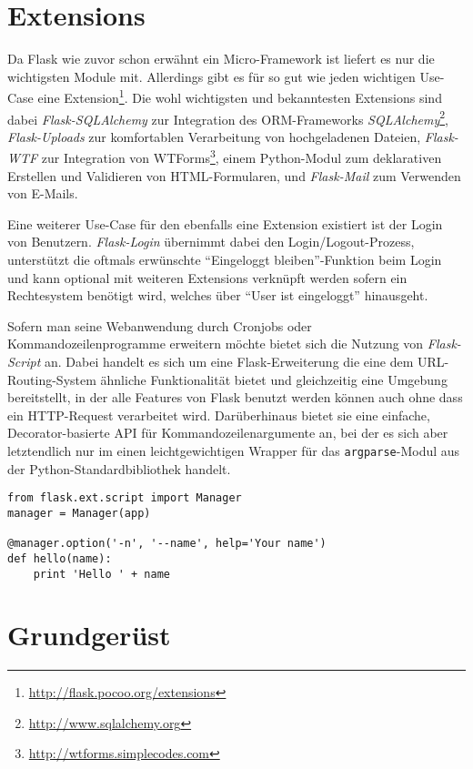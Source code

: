 \section{Extensions}

Da Flask wie zuvor schon erwähnt ein Micro-Framework ist liefert es nur die wichtigsten Module mit.
Allerdings gibt es für so gut wie jeden wichtigen Use-Case eine
Extension\footnote{\href{http://flask.pocoo.org/extensions}{http://flask.pocoo.org/extensions}}. Die
wohl wichtigsten und bekanntesten Extensions sind dabei \emph{Flask-SQLAlchemy} zur Integration des
ORM-Frameworks
\emph{SQLAlchemy}\footnote{\href{http://www.sqlalchemy.org}{http://www.sqlalchemy.org}},
\emph{Flask-Uploads} zur komfortablen Verarbeitung von hochgeladenen Dateien, \emph{Flask-WTF} zur
Integration von
WTForms\footnote{\href{http://wtforms.simplecodes.com}{http://wtforms.simplecodes.com}}, einem
Python-Modul zum deklarativen Erstellen und Validieren von HTML-Formularen, und \emph{Flask-Mail}
zum Verwenden von E-Mails.

Eine weiterer Use-Case für den ebenfalls eine Extension existiert ist der Login von Benutzern.
\emph{Flask-Login} übernimmt dabei den Login/Logout-Prozess, unterstützt die oftmals erwünschte
\enquote{Eingeloggt bleiben}-Funktion beim Login und kann optional mit weiteren Extensions verknüpft
werden sofern ein Rechtesystem benötigt wird, welches über \enquote{User ist eingeloggt} hinausgeht.

Sofern man seine Webanwendung durch Cronjobs oder Kommandozeilenprogramme erweitern möchte bietet
sich die Nutzung von \emph{Flask-Script} an. Dabei handelt es sich um eine Flask-Erweiterung die
eine dem URL-Routing-System ähnliche Funktionalität bietet und gleichzeitig eine Umgebung
bereitstellt, in der alle Features von Flask benutzt werden können auch ohne dass ein HTTP-Request
verarbeitet wird. Darüberhinaus bietet sie eine einfache, Decorator-basierte API für
Kommandozeilenargumente an, bei der es sich aber letztendlich nur im einen leichtgewichtigen Wrapper
für das \lstinline{argparse}-Modul aus der Python-Standardbibliothek handelt.

\begin{lstlisting}[label=Flask-Script]
from flask.ext.script import Manager
manager = Manager(app)

@manager.option('-n', '--name', help='Your name')
def hello(name):
    print 'Hello ' + name
\end{lstlisting}

\section{Grundgerüst}

